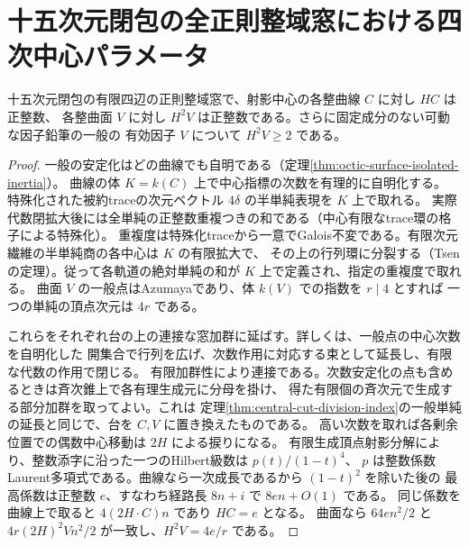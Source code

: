 \section{十五次元閉包の全正則整域窓における四次中心パラメータ}
\label{sec:main-domain-quartic-parameters}
\begin{lemma}\label{lem:main-center-integral-degrees}
十五次元閉包の有限四辺の正則整域窓で、射影中心の各整曲線 $C$ に対し $HC$ は正整数、
各整曲面 $V$ に対し $H^2 V$ は正整数である。さらに固定成分のない可動な因子鉛筆の一般の
有効因子 $V$ について $H^2V\ge2$ である。
\end{lemma}
\begin{proof}
一般の安定化はどの曲線でも自明である（定理\ref{thm:octic-surface-isolated-inertia}）。
曲線の体 $K=k(C)$ 上で中心指標の次数を有理的に自明化する。
特殊化された被約traceの次元ベクトル $4\delta$ の半単純表現を $K$ 上で取れる。
実際代数閉拡大後には全単純の正整数重複つきの和である（中心有限なtrace環の格子による特殊化）。
重複度は特殊化traceから一意でGalois不変である。有限次元繊維の半単純商の各中心は $K$ の有限拡大で、
その上の行列環に分裂する（Tsenの定理）。従って各軌道の絶対単純の和が $K$ 上で定義され、指定の重複度で取れる。
曲面 $V$ の一般点はAzumayaであり、体 $k(V)$ での指数を $r\mid4$ とすれば
一つの単純の頂点次元は $4r$ である。

これらをそれぞれ台の上の連接な窓加群に延ばす。詳しくは、一般点の中心次数を自明化した
開集合で行列を広げ、次数作用に対応する束として延長し、有限な代数の作用で閉じる。
有限加群性により連接である。次数安定化の点も含めるときは斉次錐上で各有理生成元に分母を掛け、
得た有限個の斉次元で生成する部分加群を取ってよい。これは
定理\ref{thm:central-cut-division-index}の一般単純の延長と同じで、台を $C,V$ に置き換えたものである。
高い次数を取れば各剰余位置での偶数中心移動は $2H$ による捩りになる。
有限生成頂点射影分解により、整数添字に沿った一つのHilbert級数は $p(t)/(1-t)^4$、
$p$ は整数係数Laurent多項式である。曲線なら一次成長であるから $(1-t)^2$ を除いた後の
最高係数は正整数 $e$、すなわち経路長 $8n+i$ で $8en+O(1)$ である。
同じ係数を曲線上で取ると $4(2H\cdot C)n$ であり $HC=e$ となる。
曲面なら $64e n^2/2$ と $4r(2H)^2V n^2/2$ が一致し、$H^2V=4e/r$ である。


\end{proof}
